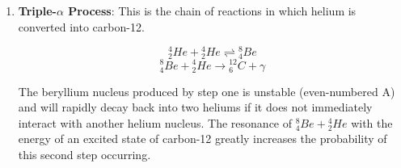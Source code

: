 \begin{enumerate}
 \item \textbf{Triple-$\alpha$ Process}: This is the chain of reactions in which helium is converted into carbon-12.
 
 \begin{equation}
 ^4_2He + \text{}^4_2He \rightleftharpoons \text{}^8_4Be
 \end{equation}
 \begin{equation}
 ^8_4Be + \text{}^4_2He \rightarrow \text{}^{12}_6C + \gamma
 \end{equation}
 
 The beryllium nucleus produced by step one is unstable (even-numbered A) and will rapidly decay back into two heliums if it does not immediately interact with another helium nucleus.  The resonance of $^8_4Be + \text{}^4_2He$ with the energy of an excited state of carbon-12 greatly increases the probability of this second step occurring.
 \end{enumerate}
